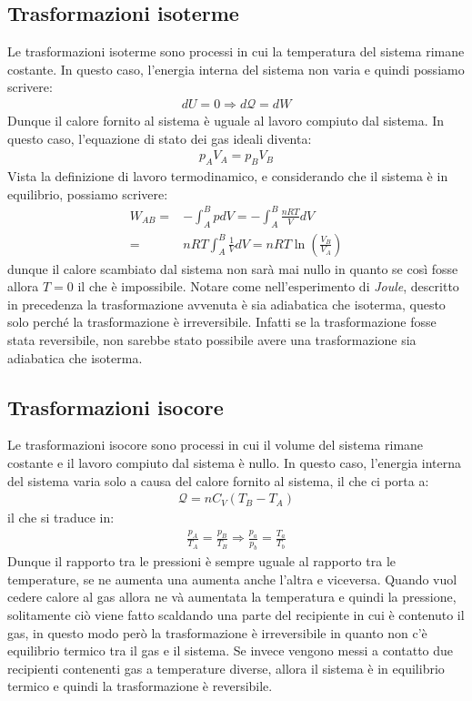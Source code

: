     \subsection{Trasformazioni isoterme}
        Le trasformazioni isoterme sono processi in cui la temperatura del sistema rimane costante. In questo caso, l'energia interna del sistema non varia e quindi possiamo scrivere:
        \begin{align*}
            dU = 0 \Rightarrow d\mathcal{Q} = dW
        \end{align*}
        Dunque il calore fornito al sistema è uguale al lavoro compiuto dal sistema. In questo caso, l'equazione di stato dei gas ideali diventa:
        \begin{align*}
            p_AV_A = p_BV_B
        \end{align*}
        Vista la definizione di lavoro termodinamico, e considerando che il sistema è in equilibrio, possiamo scrivere:
        \begin{align*}
            W_{AB} =& -\int_{A}^{B} p dV = -\int_{A}^{B} \frac{nRT}{V} dV\\
            =& nRT\int_{A}^{B} \frac{1}{V} dV = nRT\operatorname{ln}\left(\frac{V_B}{V_A}\right)
        \end{align*}
        dunque il calore scambiato dal sistema non sarà mai nullo in quanto se così fosse allora $T=0$ il che è impossibile.\newline
        Notare come nell'esperimento di \textit{Joule}, descritto in precedenza la trasformazione avvenuta è sia adiabatica che isoterma, questo solo perché la trasformazione è irreversibile. Infatti se la trasformazione fosse stata reversibile, non sarebbe stato possibile avere una trasformazione sia adiabatica che isoterma. 
    \subsection{Trasformazioni isocore}
        Le trasformazioni isocore sono processi in cui il volume del sistema rimane costante e il lavoro compiuto dal sistema è nullo. In questo caso, l'energia interna del sistema varia solo a causa del calore fornito al sistema, il che ci porta a:
        \begin{align*}
            \mathcal{Q} = nC_V(T_B - T_A)
        \end{align*}
        il che si traduce in:
        \begin{align*}
            \frac{p_A}{T_A} = \frac{p_B}{T_B} \Rightarrow \frac{p_a}{p_b} = \frac{T_a}{T_b}
        \end{align*}
        Dunque il rapporto tra le pressioni è sempre uguale al rapporto tra le temperature, se ne aumenta una aumenta anche l'altra e viceversa. Quando vuol cedere calore al gas allora ne và aumentata la temperatura e quindi la pressione, solitamente ciò viene fatto scaldando una parte del recipiente in cui è contenuto il gas, in questo modo però la trasformazione è irreversibile in quanto non c'è equilibrio termico tra il gas e il sistema. Se invece vengono messi a contatto due recipienti contenenti gas a temperature diverse, allora il sistema è in equilibrio termico e quindi la trasformazione è reversibile.
